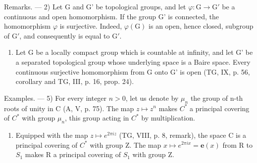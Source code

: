 Remarks. --- 2) Let G and G' be topological groups, and let \(\varphi\colon\mathrm{G}\to\mathrm{G}'\) be a continuous and open homomorphism. If the group G' is connected, the homomorphism \(\varphi\) is surjective. Indeed, \(\varphi(\mathrm{G})\) is an open, hence closed, subgroup of \(\mathrm{G}'\), and consequently is equal to \(\mathrm{G}'\).

\begin{enumerate}
\def\labelenumi{\arabic{enumi})}
\setcounter{enumi}{2}
\tightlist
\item
  Let G be a locally compact group which is countable at infinity, and let G' be a separated topological group whose underlying space is a Baire space. Every continuous surjective homomorphism from G onto G' is open (TG, IX, p. 56, corollary and TG, III, p. 16, prop. 24).
\end{enumerate}

Examples. --- 5) For every integer \(n > 0\), let us denote by \(\mu_{n}\) the group of n-th roots of unity in C (A, V, p. 75). The map \(z \mapsto z^{n}\) makes \(C^{*}\) a principal covering of \(C^{*}\) with group \(\mu_{n}\), this group acting in \(C^{*}\) by multiplication.

\begin{enumerate}
\def\labelenumi{\arabic{enumi})}
\setcounter{enumi}{5}
\tightlist
\item
  Equipped with the map \(z \mapsto e^{2\pi iz}\) (TG, VIII, p. 8, remark), the space C is a principal covering of \(C^{*}\) with group Z. The map \(x \mapsto e^{2\pi ix} = \mathbf{e}(x)\) from R to \(S_{1}\) makes R a principal covering of \(S_{1}\) with group Z.
\end{enumerate}

